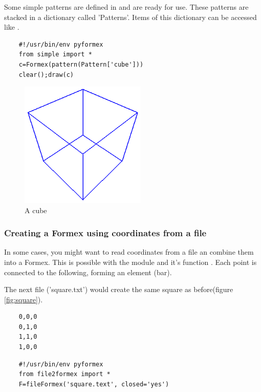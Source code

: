 {Some simple patterns are defined in  and are ready for use. These patterns are stacked in a dictionary called 'Patterns'. Items of this dictionary can be accessed like .
\begin{verbatim}
	#!/usr/bin/env pyformex
	from simple import *
	c=Formex(pattern(Pattern['cube']))
	clear();draw(c)
\end{verbatim}

\begin{figure}[h]
  \centering
  \begin{makeimage}
  \end{makeimage}
  \begin{latexonly}
    \includegraphics[width=6cm]{images/cube}
  \end{latexonly}
  \begin{htmlonly}
  \end{htmlonly}  
  \caption{A cube}
  \label{fig:cube}
\end{figure}

\subsubsection{Creating a Formex using coordinates from a file}
In some cases, you might want to read coordinates from a file an combine them into a Formex. This is possible with the module  and it's function . Each point is connected to the following, forming an element (bar).

The next file ('square.txt') would create the same square as before(figure \ref{fig:square}).
\begin{verbatim}
	0,0,0
	0,1,0
	1,1,0
	1,0,0
\end{verbatim}
\begin{verbatim}
	#!/usr/bin/env pyformex
	from file2formex import *
	F=fileFormex('square.text', closed='yes')
\end{verbatim}

}
